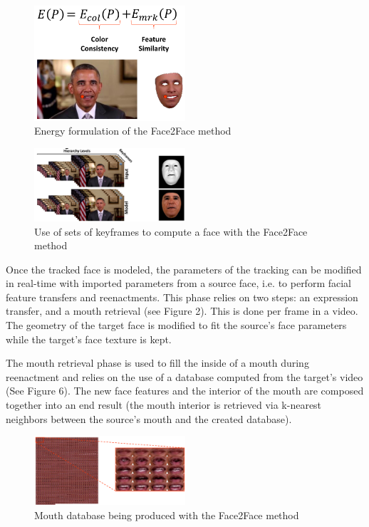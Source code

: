 \documentclass{article} %
\begin{document}
\begin{figure}[H]
\begin{center}
\includegraphics[width=0.5\textwidth]{images/energy.png}
\end{center}
\caption{Energy formulation of the Face2Face method \citep{Thies2016}}
\end{figure}

\begin{figure}[H]
\begin{center}
\includegraphics[width=0.5\textwidth]{images/nrmbb.png}
\end{center}
\caption{Use of sets of keyframes to compute a face with the Face2Face method \citep{Thies2016}}
\end{figure}

Once the tracked face is modeled, the parameters of the tracking can be modified in real-time with imported parameters from a source face, i.e. to perform facial feature transfers and reenactments. This phase relies on two steps: an expression transfer, and a mouth retrieval (see Figure 2). This is done per frame in a video. The geometry of the target face is modified to fit the source's face parameters while the target's face texture is kept.

The mouth retrieval phase is used to fill the inside of a mouth during reenactment and relies on the use of a database computed from the target's video (See Figure 6). The new face features and the interior of the mouth are composed together into an end result (the mouth interior is retrieved via k-nearest neighbors between the source's mouth and the created database).

\begin{figure}[H]
\begin{center}
\includegraphics[width=0.5\textwidth]{images/mouth_database.png}
\end{center}
\caption{Mouth database being produced with the Face2Face method \citep{Thies2016}}
\end{figure}
\end{document}
